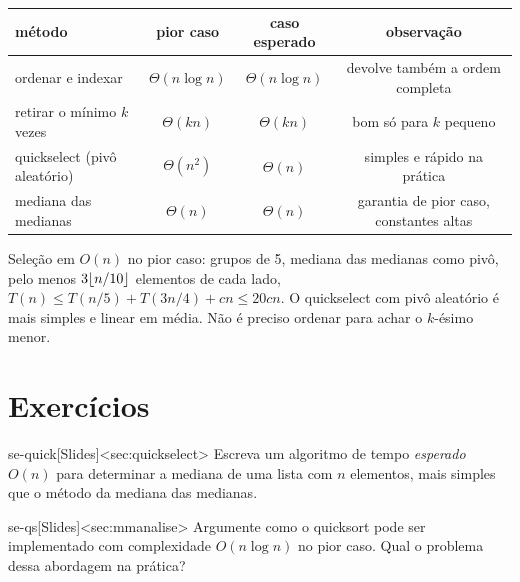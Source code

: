 \begin{center}\small
\begin{tabular}{@{}lccc@{}}
\toprule
método & pior caso & caso esperado & observação\\
\midrule
ordenar e indexar & $\Theta(n\log n)$ & $\Theta(n\log n)$ & devolve também a ordem completa\\
retirar o mínimo $k$ vezes & $\Theta(kn)$ & $\Theta(kn)$ & bom só para $k$ pequeno\\
quickselect (pivô aleatório) & $\Theta(n^2)$ & $\Theta(n)$ & simples e rápido na prática\\
mediana das medianas & $\Theta(n)$ & $\Theta(n)$ & garantia de pior caso, constantes altas\\
\bottomrule
\end{tabular}
\end{center}

\begin{chave}
Seleção em $O(n)$ no pior caso: grupos de 5, mediana das medianas como pivô, pelo menos $3\lfloor n/10\rfloor$ elementos de cada lado, $T(n)\le T(n/5)+T(3n/4)+cn\le20cn$. O quickselect com pivô aleatório é mais simples e linear em média. Não é preciso ordenar para achar o $k$-ésimo menor.
\end{chave}

\section{Exercícios}
\excurso
\begin{exercicio}{se-quick}[Slides]<sec:quickselect>
Escreva um algoritmo de tempo \emph{esperado} $O(n)$ para determinar a mediana de uma lista com $n$ elementos, mais simples que o método da mediana das medianas.
\end{exercicio}
\begin{exercicio}{se-qs}[Slides]<sec:mmanalise>
Argumente como o quicksort pode ser implementado com complexidade $O(n\log n)$ no pior caso. Qual o problema dessa abordagem na prática?
\end{exercicio}

